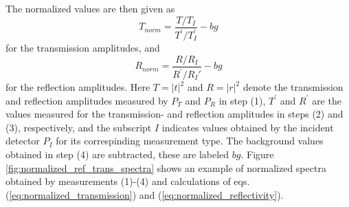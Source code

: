 The normalized values are then given as
\begin{equation}
    T_{norm} = \frac{T/T_I}{T^{\prime}/T_I^{\prime}} - bg
    \label{eq:normalized_transmission}
\end{equation}
for the transmission amplitudes, and
\begin{equation}
    R_{norm} = \frac{R/R_I}{R^{\prime}/R_I{\prime}} - bg
    \label{eq:normalized_reflectivity}
\end{equation}
for the reflection amplitudes. Here $T=|t|^2$ and $R=|r|^2$ denote the transmission and reflection amplitudes measured by $P_T$ and $P_R$ in step (1), $T^{\prime}$ and $R^{\prime}$ are the values measured for the transmission- and reflection amplitudes in steps (2) and (3), respectively, and the subscript $I$ indicates values obtained by the incident detector $P_I$ for its correspinding measurement type. The background values obtained in step (4) are subtracted, these are labeled $bg$. Figure \ref{fig:normalized_ref_trans_spectra} shows an example of normalized spectra obtained by measurements (1)-(4) and calculations of eqs. (\ref{eq:normalized_transmission}) and (\ref{eq:normalized_reflectivity}).



